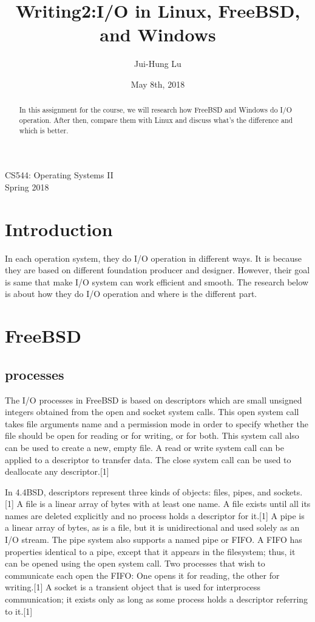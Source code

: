 \documentclass[onecolumn, draftclsnofoot,10pt, compsoc]{IEEEtran}
\title{Writing2:I/O in Linux, FreeBSD, and Windows}
\author{
  Jui-Hung Lu
}
\date{May 8th, 2018}
\begin{document}
\maketitle
\begin{center}
CS544: Operating Systems II \\
Spring 2018
\vspace{50 mm}
\end{center}
\begin{abstract}
In this assignment for the course, we will research how FreeBSD and Windows do I/O operation. After then, compare them with Linux and discuss what's the difference and which is better.
\end{abstract}
\newpage
\section{Introduction}
In each operation system, they do I/O operation in different ways. It is because they are based on different foundation producer and designer. However, their goal is same that make I/O system can work efficient and smooth. The research below is about how they do I/O operation and where is the different part.
\section{FreeBSD}
\subsection{processes}
The I/O processes in FreeBSD is based on descriptors which are small unsigned integers obtained from the open and socket system calls. This open system call takes file arguments name and a permission mode in order to specify whether the file should be open for reading or for writing, or for both. This system call also can be used to create a new, empty file. A read or write system call can be applied to a descriptor to transfer data. The close system call can be used to deallocate any descriptor.[1]

In 4.4BSD, descriptors represent three kinds of objects: files, pipes, and sockets.[1]
A file is a linear array of bytes with at least one name. A file exists until all its names are deleted explicitly and no process holds a descriptor for it.[1]
A pipe is a linear array of bytes, as is a file, but it is unidirectional and used solely as an I/O stream. The pipe system also supports a named pipe or FIFO. A FIFO has properties identical to a pipe, except that it appears in the filesystem; thus, it can be opened using the open system call. Two processes that wish to communicate each open the FIFO: One opens it for reading, the other for writing.[1] A socket is a transient object that is used for interprocess communication; it exists only as long as some process holds a descriptor referring to it.[1]
\end{document}
